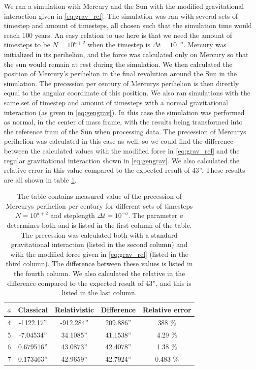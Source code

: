 \documentclass[reprint,english,notitlepage]{revtex4-1}  %
\begin{document}
We ran a simulation with Mercury and the Sun with the modified gravitational interaction given in \eqref{eq:grav_rel}. The simulation was ran with several sets of timestep and amount of timesteps, all chosen such that the simulation time would reach 100 years. An easy relation to use here is that we need the amount of timesteps to be $N = 10^{a+2}$ when the timestep is $\Delta t =  10^{-a}$. Mercury was initialized in its perihelion, and the force was calculated only on Mercury so that the sun would remain at rest during the simulation. We then calculated the position of Mercury's perihelion in the final revolution around the Sun in the simulation. The precession per century of Mercurys perihelion is then directly equal to the angular coordinate of this position. We also ran simulations with the same set of timestep and amount of timesteps with a normal gravitational interaction (as given in \eqref{eq:gengrav}). In this case the simulation was performed as normal, in the center of mass frame, with the results being transformed into the reference fram of the Sun when processing data. The precession of Mercurys perihelion was calculated in this case as well, so we could find the difference between the calculated values with the modified force in \eqref{eq:grav_rel} and the regular gravitational interaction shown in \eqref{eq:gengrav}. We also calculated the relative error in this value compared to the expected result of 43''. These results are all shown in table \ref{table:precession}.


\begin{table}[H]
\caption{The table contains measured value of the precession of Mercurys perihelion per century for different sets of timesteps $N = 10^{a+2}$ and steplength $\Delta t = 10^{-a}$. The parameter $a$ determines both and is listed in the first column of the table. The precession was calculated both with a standard gravitational interaction (listed in the second column) and with the modified force given in \eqref{eq:grav_rel} (listed in the third column). The difference between these values is listed in the fourth column. We also calculated the relative in the difference compared to the expected result of 43'', and this is listed in the last column. }
\begin{tabular}{|c|c|c|c|c|}
\hline
$a$ & Classical & Relativistic & Difference & Relative error \\
\hline
4 & -1122.17'' & -912.284'' & 209.886'' & 388 \% \\
5 & -7.04534'' & 34.1085'' & 41.1538'' & 4.29 \% \\
6 & 0.679516'' & 43.0873'' & 42.4078'' & 1.38 \% \\
7 & 0.173463'' & 42.9659'' & 42.7924'' & 0.483 \% \\
\hline
\end{tabular}
\label{table:precession}
\end{table}
\end{document}
